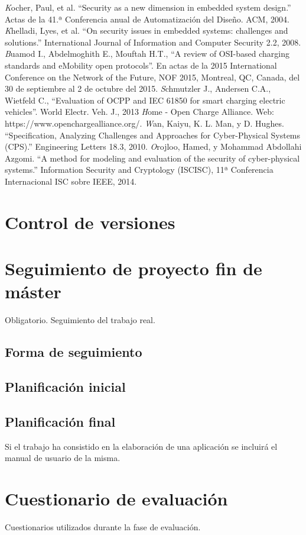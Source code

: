 \documentclass[12pt,a4paper,onecolumn,oneside]{report}
\begin{document}
\begin{thebibliography}{1}
 \textit Kocher, Paul, et al. ``Security as a new dimension in embedded system design.” Actas de la 41.ª Conferencia anual de Automatización del Diseño. ACM, 2004.
 \textit Khelladi, Lyes, et al. ``On security issues in embedded systems: challenges and solutions.” International Journal of Information and Computer Security 2.2, 2008.
 \textit Buamod I., Abdelmoghith E.,  Mouftah H.T., ``A review of OSI-based charging standards and eMobility open protocols”. En actas de la 2015 International Conference on the Network of the Future, NOF 2015, Montreal, QC, Canada, del 30 de septiembre al 2 de octubre del 2015.
 \textit Schmutzler J., Andersen C.A., Wietfeld C., ``Evaluation of OCPP and IEC 61850 for smart charging electric
vehicles”. World Electr. Veh. J., 2013
 \textit Home - Open Charge Alliance. Web: https://www.openchargealliance.org/.
 \textit Wan, Kaiyu, K. L. Man, y D. Hughes. ``Specification, Analyzing Challenges and Approaches for Cyber-Physical Systems (CPS).” Engineering Letters 18.3, 2010.
 \textit Orojloo, Hamed, y Mohammad Abdollahi Azgomi. ``A method for modeling and evaluation of the security of cyber-physical systems.” Information Security and Cryptology (ISCISC), 11ª Conferencia Internacional ISC sobre IEEE, 2014.


\end{thebibliography}



\renewcommand{\appendixname}{Anexo}
\appendix

\chapter{Control de versiones}
\label{Control de versiones}




\chapter{Seguimiento de proyecto fin de máster}
\label{Seguimiento de proyecto fin de máster}


Obligatorio. Seguimiento del trabajo real.

\section{Forma de seguimiento}

\section{Planificación inicial}

\section{Planificación final}
Si el trabajo ha consistido en la elaboración de una aplicación se incluirá el manual de usuario de la misma.


\chapter{Cuestionario de evaluación}
\label{Cuestionario de evaluación}

Cuestionarios utilizados durante la fase de evaluación.
\end{document}
